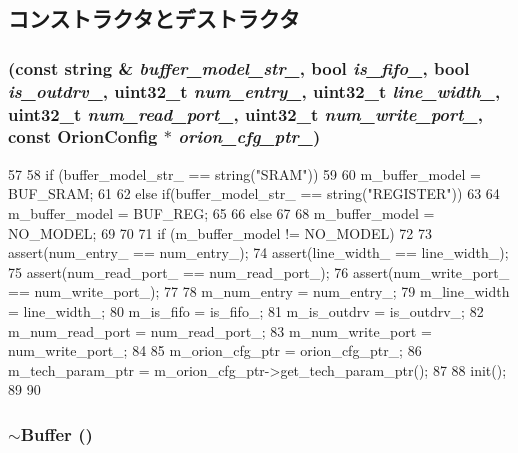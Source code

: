 \subsection{コンストラクタとデストラクタ}
\hypertarget{classBuffer_a2aaebb88cefd77cf975f76e3f0f6a88d}{
\subsubsection[{Buffer}]{ (const string \& {\em buffer\_\-model\_\-str\_\-}, \/  bool {\em is\_\-fifo\_\-}, \/  bool {\em is\_\-outdrv\_\-}, \/  {\bf uint32\_\-t} {\em num\_\-entry\_\-}, \/  {\bf uint32\_\-t} {\em line\_\-width\_\-}, \/  {\bf uint32\_\-t} {\em num\_\-read\_\-port\_\-}, \/  {\bf uint32\_\-t} {\em num\_\-write\_\-port\_\-}, \/  const {\bf OrionConfig} $\ast$ {\em orion\_\-cfg\_\-ptr\_\-})}}
\label{classBuffer_a2aaebb88cefd77cf975f76e3f0f6a88d}



\begin{DoxyCode}
57 {
58     if (buffer_model_str_ == string("SRAM"))
59     {
60         m_buffer_model = BUF_SRAM;
61     }
62     else if(buffer_model_str_ == string("REGISTER"))
63     {
64         m_buffer_model = BUF_REG;
65     }
66     else
67     {
68         m_buffer_model = NO_MODEL;
69     }
70 
71     if (m_buffer_model != NO_MODEL)
72     {
73         assert(num_entry_ == num_entry_);
74         assert(line_width_ == line_width_);
75         assert(num_read_port_ == num_read_port_);
76         assert(num_write_port_ == num_write_port_);
77 
78         m_num_entry = num_entry_;
79         m_line_width = line_width_;
80         m_is_fifo = is_fifo_;
81         m_is_outdrv = is_outdrv_;
82         m_num_read_port = num_read_port_;
83         m_num_write_port = num_write_port_;
84 
85         m_orion_cfg_ptr = orion_cfg_ptr_;
86         m_tech_param_ptr = m_orion_cfg_ptr->get_tech_param_ptr();
87 
88         init();
89     }
90 }
\end{DoxyCode}
\hypertarget{classBuffer_ac72b418d40e29411ac044a49a20be750}{
\subsubsection[{$\sim$Buffer}]{\setlength{\rightskip}{0pt plus 5cm}$\sim${\bf Buffer} ()}}
\label{classBuffer_ac72b418d40e29411ac044a49a20be750}



